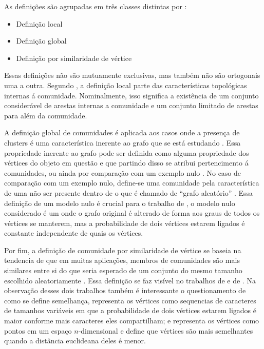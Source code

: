 \documentclass[notes.tex]{subfiles}
\begin{document}
As definições são agrupadas em três classes distintas por :

\begin{itemize}
    \item Definição local
    \item Definição global
    \item Definição por similaridade de vértice
\end{itemize}

Essas definições não são mutuamente exclusivas, mas também não são ortogonais uma a outra.
Segundo , a definição local parte das características topológicas internas á comunidade.
Nominalmente, isso significa a existência de um conjunto considerável de arestas internas a comunidade e um conjunto limitado de arestas para além da comunidade.

A definição global de comunidades é aplicada aos casos onde a presença de clusters é uma característica inerente ao grafo que se está estudando .
Essa propriedade inerente ao grafo pode ser definida como alguma propriedade dos vértices do objeto em questão e que partindo disso se atribui pertencimento á comunidades, ou ainda por comparação com um exemplo nulo .
No caso de comparação com um exemplo nulo, define-se uma comunidade pela característica de uma não ser presente dentro de o que é chamado de ``grafo aleatório'' \cite{fortunato2010community}.
Essa definição de um modelo nulo é crucial para o trabalho de , o modelo nulo considerado é um onde o grafo original é alterado de forma aos graus de todos os vértices se manterem, mas a probabilidade de dois vértices estarem ligados é constante independente de quais os vértices.

Por fim, a definição de comunidade por similaridade de vértice se baseia na tendencia de que em muitas aplicações, membros de comunidades são mais similares entre si do que seria esperado de um conjunto do mesmo tamanho escolhido aleatoriamente \cite{fortunato2010community}.
Essa definição se faz visível no trabalhos de  e de .
Na observação desses dois trabalhos também é interessante o questionamento de como se define semelhança,  representa os vértices como sequencias de caracteres de tamanhos variáveis em que a probabilidade de dois vértices estarem ligados é maior conforme mais caracteres eles compartilham; e  representa os vértices como pontos em um espaço $n$-dimensional e define que vértices são mais semelhantes quando a distância euclideana deles é menor.
\end{document}
